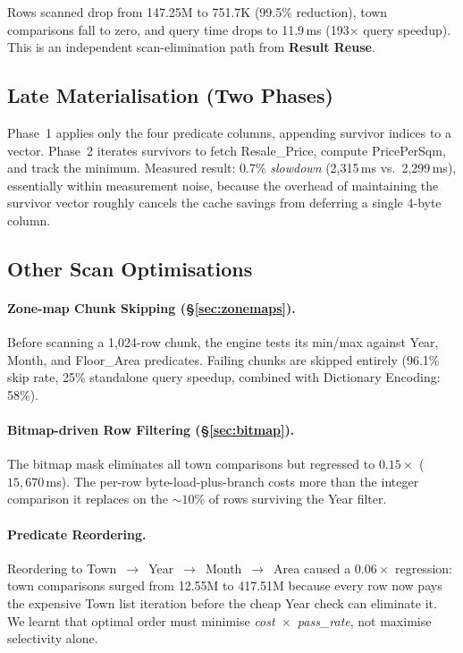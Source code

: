 \documentclass[11pt,a4paper]{article}
\begin{document}
Rows scanned drop from 147.25M to 751.7K (99.5\% reduction), town comparisons fall to zero, and query time drops to 11.9\,ms (193$\times$ query speedup).
This is an independent scan-elimination path from \textbf{Result Reuse}.

\subsection{Late Materialisation (Two Phases)}\label{sec:c3}

Phase~1 applies only the four predicate columns, appending survivor indices to a vector.
Phase~2 iterates survivors to fetch Resale\_Price, compute PricePerSqm, and track the minimum.
Measured result: 0.7\% \emph{slowdown} (2,315\,ms vs.\ 2,299\,ms), essentially within measurement noise, because the overhead of maintaining the survivor vector roughly cancels the cache savings from deferring a single 4-byte column.

\subsection{Other Scan Optimisations}\label{sec:other}

\paragraph{Zone-map Chunk Skipping (\S\ref{sec:zonemaps}).}
Before scanning a 1,024-row chunk, the engine tests its min/max against Year, Month, and Floor\_Area predicates.
Failing chunks are skipped entirely (96.1\% skip rate, 25\% standalone query speedup, combined with Dictionary Encoding: 58\%).

\paragraph{Bitmap-driven Row Filtering (\S\ref{sec:bitmap}).}
The bitmap mask eliminates all town comparisons but regressed to $0.15\times$ ($15{,}670$\,ms).
The per-row byte-load-plus-branch costs more than the integer comparison it replaces on the ${\sim}10\%$ of rows surviving the Year filter.

\paragraph{Predicate Reordering.}
Reordering to Town~$\to$~Year~$\to$~Month~$\to$~Area caused a $0.06\times$ regression: town comparisons surged from 12.55M to 417.51M because every row now pays the expensive Town list iteration before the cheap Year check can eliminate it. We learnt that optimal order must minimise \emph{cost~$\times$~pass\_rate}, not maximise selectivity alone.
\end{document}
